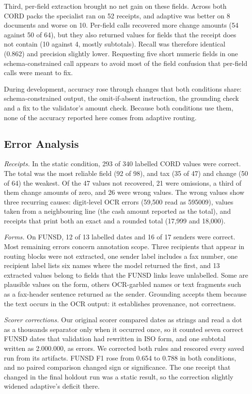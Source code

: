 \documentclass[conference,a4paper]{IEEEtran}
\begin{document}
Third, per-field extraction brought no net gain on these fields. Across both CORD packs the specialist ran on 52 receipts, and adaptive was better on 8 documents and worse on 10. Per-field calls recovered more change amounts (54 against 50 of 64), but they also returned values for fields that the receipt does not contain (10 against 4, mostly subtotals). Recall was therefore identical (0.862) and precision slightly lower. Requesting five short numeric fields in one schema-constrained call appears to avoid most of the field confusion that per-field calls were meant to fix.

During development, accuracy rose through changes that both conditions share: schema-constrained output, the omit-if-absent instruction, the grounding check and a fix to the validator's amount check. Because both conditions use them, none of the accuracy reported here comes from adaptive routing.

\subsection{Error Analysis}
\textit{Receipts.} In the static condition, 293 of 340 labelled CORD values were correct. The total was the most reliable field (92 of 98), and tax (35 of 47) and change (50 of 64) the weakest. Of the 47 values not recovered, 21 were omissions, a third of them change amounts of zero, and 26 were wrong values. The wrong values show three recurring causes: digit-level OCR errors (59,500 read as 595009), values taken from a neighbouring line (the cash amount reported as the total), and receipts that print both an exact and a rounded total (17,999 and 18,000).

\textit{Forms.} On FUNSD, 12 of 13 labelled dates and 16 of 17 senders were correct. Most remaining errors concern annotation scope. Three recipients that appear in routing blocks were not extracted, one sender label includes a fax number, one recipient label lists six names where the model returned the first, and 13 extracted values belong to fields that the FUNSD links leave unlabelled. Some are plausible values on the form, others OCR-garbled names or text fragments such as a fax-header sentence returned as the sender. Grounding accepts them because the text occurs in the OCR output: it establishes provenance, not correctness.

\textit{Scorer corrections.} Our original scorer compared dates as strings and read a dot as a thousands separator only when it occurred once, so it counted seven correct FUNSD dates that validation had rewritten in ISO form, and one subtotal written as 2.000.000, as errors. We corrected both rules and rescored every saved run from its artifacts. FUNSD F1 rose from 0.654 to 0.788 in both conditions, and no paired comparison changed sign or significance. The one receipt that changed in the final holdout run was a static result, so the correction slightly widened adaptive's deficit there.
\end{document}

